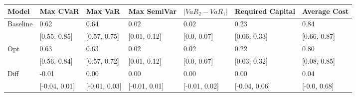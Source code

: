 \begin{tabular}{lllllll}
\toprule
   Model &      Max CVaR &       Max VaR &   Max SemiVar & $|VaR_2 - VaR_1|$ & Required Capital & Average Cost \\
\midrule
Baseline &          0.62 &          0.64 &          0.02 &              0.02 &             0.23 &         0.84 \\
         &  [0.55, 0.85] &  [0.57, 0.75] &  [0.01, 0.12] &       [0.0, 0.07] &     [0.06, 0.33] & [0.66, 0.87] \\
     Opt &          0.63 &          0.63 &          0.02 &              0.02 &             0.22 &         0.80 \\
         &  [0.56, 0.84] &  [0.57, 0.72] &  [0.01, 0.12] &       [0.0, 0.07] &     [0.03, 0.32] & [0.08, 0.85] \\
    Diff &         -0.01 &          0.00 &          0.00 &              0.00 &             0.00 &         0.04 \\
         & [-0.04, 0.01] & [-0.01, 0.03] & [-0.01, 0.01] &     [-0.01, 0.02] &    [-0.04, 0.06] & [-0.0, 0.68] \\
\bottomrule
\end{tabular}
